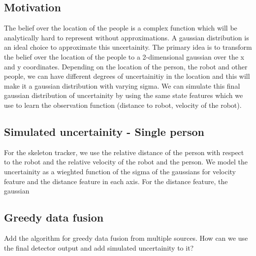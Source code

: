 \subsection{Motivation} 
The belief over the location of the people is a complex function which will be analytically hard to represent without approximations. A gaussian distribution is an ideal choice to approximate this uncertainity. The primary idea is to transform the belief over the location of the people to a 2-dimensional gaussian over the x and y coordinates. Depending on the location of the person, the robot and other people, we can have different degrees of uncertainitiy in the location and this will make it a gaussian distribution with varying sigma. We can simulate this final gaussian distribution of uncertainity by using the same state features which we use to learn the observation function (distance to robot, velocity of the robot). 

\subsection{Simulated uncertainity - Single person}

For the skeleton tracker, we use the relative distance of the person with respect to the robot and the relative velocity of the robot and the person. We model the uncertainity as a wieghted function of the sigma of the gaussians for velocity feature and the distance feature in each axis. For the distance feature, the gaussian 

\subsection{Greedy data fusion}

Add the algorithm for greedy data fusion from multiple sources. How can we use the final detector output and add simulated uncertainity to it?
